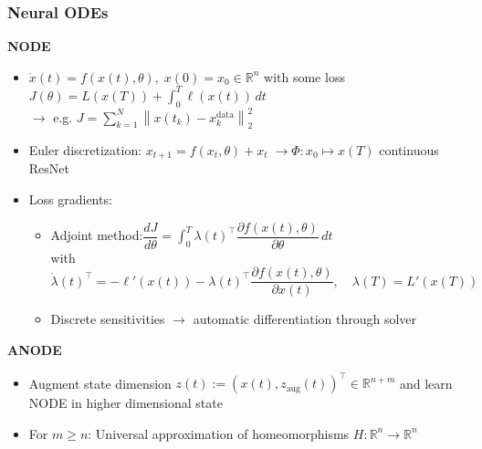 \documentclass[11pt,aspectratio=169]{beamer}
\newcommand{\norm}[1]{\left\lVert#1\right\rVert}
\newcommand{\R}{\mathbb{R}}
\begin{document}
\begin{frame}[t]
    \frametitle{Neural ODEs}
    \textbf{NODE}\\
    \begin{itemize}
        \item $\dot{x}(t) = f(x(t), \theta), \; x(0)=x_0\in \R^n$\; with some loss $J(\theta) = L(x(T)) + \int_0^T \ell(x(t))\,dt$\\
        $\to$ e.g. $J = \sum_{k=1}^N \norm{x(t_k)-x_k^{\text{data}}}_2^2$
        \item Euler discretization:\; $x_{t+1} = f(x_t, \theta) + x_t \;\to \Phi:x_0\mapsto x(T)$  continuous ResNet
        \item Loss gradients:
            \begin{itemize}
                \item Adjoint method:\quad $\dfrac{dJ}{d\theta} = \int_{0}^{T} \lambda(t)^\top \dfrac{\partial f(x(t),\theta)}{\partial \theta}\,dt$\\\vspace{0.1cm}
                with $\dot{\lambda}(t)^\top = -\ell'(x(t)) - \lambda(t)^\top \dfrac{\partial f(x(t),\theta)}{\partial x(t)},\quad \lambda(T)=L'(x(T))$\vspace{0.1cm}
                
                \item Discrete sensitivities $\to$ automatic differentiation through solver
            \end{itemize}
     \end{itemize}
     \textbf{ANODE}\\
     \begin{itemize}
         \item Augment state dimension $z(t):=\left(x(t),z_{\text{aug}}(t)\right)^\top\in\R^{n+m}$ and learn NODE in higher dimensional state
         \item For $m\geq n$: Universal approximation of homeomorphisms $H:\R^n\to \R^n$
     \end{itemize}
\end{frame}


\end{document}
